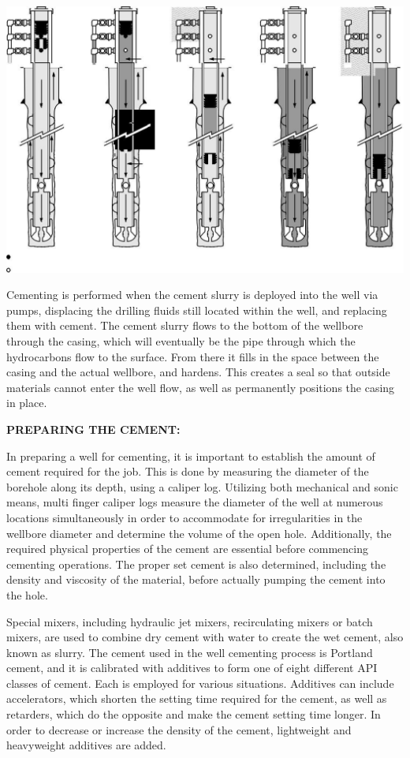 \includegraphics[scale=0.3]{images/primarycemtingoperation}



Cementing is performed when the cement slurry is deployed into the well via pumps,
displacing the drilling fluids still located within the well, and replacing them with cement.
The cement slurry flows to the bottom of the wellbore through the casing, 
which will eventually be the pipe through which the hydrocarbons flow to the surface. 
From there it fills in the space between the casing and the actual wellbore,
and hardens. This creates a seal so that outside materials cannot enter the well flow, as well as permanently positions the casing in place.



\textbf{PREPARING THE CEMENT:}

In preparing a well for cementing, it is important to establish the amount of cement required for the job.
This is done by measuring the diameter of the borehole along its depth, 
using a caliper log. Utilizing both mechanical and sonic means,
multi finger caliper logs measure the diameter of the well at numerous locations simultaneously in order to accommodate for irregularities in the wellbore diameter and determine the volume of the open hole.
Additionally, the required physical properties of the cement are essential before commencing 
cementing operations. The proper set cement is also determined, 
including the density and viscosity of the material, before actually pumping the cement into the hole.

\vspace{1em}

Special mixers, including hydraulic jet mixers, recirculating mixers or batch mixers,
are used to combine dry cement with water to create the wet cement, also known as slurry. 
The cement used in the well cementing process is Portland cement, and it is calibrated 
with additives to form one of eight different API classes of cement. Each is employed for various situations.
Additives can include accelerators, which shorten the setting time required for the cement,
as well as retarders, which do the opposite and make the cement setting time longer.
In order to decrease or increase the density of the cement, lightweight and heavyweight additives are added.

